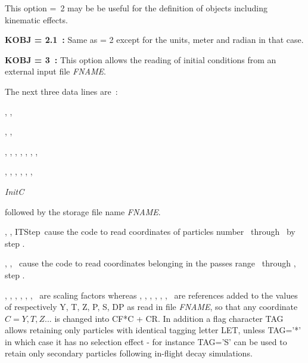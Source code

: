 \smallskip

\noindent This option \mbox{\KOBJ= 2}   may be be useful for the definition of objects including kinematic  effects.  



\bigskip

\noindent\textbf{KOBJ = 2.1~:} Same as \KOBJ = 2    except for the units, meter and radian in that case. 




\bigskip




\noindent\textbf{KOBJ = 3~:} This option allows the reading of initial conditions from an
external input file \textsl{FNAME}.  

\noindent The next three data lines are~: 

\smallskip 

\ITone, \ITtwo, \ITStep

\IPone, \IPtwo, \IPStep

\YF, \TF, \ZF, \PF, \SF, \DPF, \TiF, \TAG      {} 

\YR, \TR, \ZR, \PR, \SR, \DPR, \TiR

\textsl{InitC}

\smallskip 

\noindent followed by the storage file name \textsl{FNAME}. 

\smallskip 

\noindent \ITone, \ITtwo, ITStep\ cause the code to read coordinates of particles number \ITone\ through  \ITtwo\ by step \ITStep. 

\smallskip 

\noindent \IPone, \IPtwo, \IPStep\  cause the code to read coordinates belonging in the  passes range   
 \IPone\ through  \IPtwo,  step \IPStep. 


\smallskip 

\noindent \YF, \TF, \ZF, \PF, \SF, \DPF, \TiF\ are scaling factors whereas 
 \YR, \TR, \ZR, \PR, \SR, \DPR, \TiR\ are  references added to the  values of respectively Y, T, Z, P, S, DP as read 
in  file \textsl{FNAME}, 
 so that any coordinate $C=Y,T,Z...$ is changed into CF*C + CR. 
In addition a flag character TAG allows retaining only particles with identical tagging letter LET, unless 
TAG='*' in which case it has no selection effect - for instance TAG='S' can be used to retain only secondary 
particles following in-flight decay simulations. 

\smallskip 

